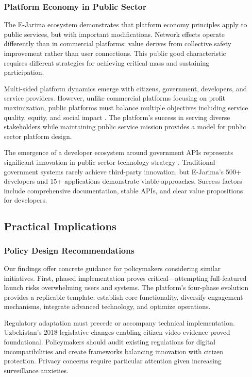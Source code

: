 \documentclass[pdflatex,sn-mathphys-num]{sn-jnl}%
\theoremstyle{thmstyleone}%
\theoremstyle{thmstyletwo}%
\theoremstyle{thmstylethree}%
\begin{document}
\subsubsection{Platform Economy in Public Sector}

The E-Jarima ecosystem demonstrates that platform economy principles apply to public services, but with important modifications. Network effects operate differently than in commercial platforms: value derives from collective safety improvement rather than user connections. This public good characteristic requires different strategies for achieving critical mass and sustaining participation.

Multi-sided platform dynamics emerge with citizens, government, developers, and service providers. However, unlike commercial platforms focusing on profit maximization, public platforms must balance multiple objectives including service quality, equity, and social impact \cite{rose2015stakeholder}. The platform's success in serving diverse stakeholders while maintaining public service mission provides a model for public sector platform design.

The emergence of a developer ecosystem around government APIs represents significant innovation in public sector technology strategy \cite{mergel2013social,bertot2010using}. Traditional government systems rarely achieve third-party innovation, but E-Jarima's 500+ developers and 15+ applications demonstrate viable approaches. Success factors include comprehensive documentation, stable APIs, and clear value propositions for developers.

\subsection{Practical Implications}\label{subsec21}

\subsubsection{Policy Design Recommendations}

Our findings offer concrete guidance for policymakers considering similar initiatives. First, phased implementation proves critical—attempting full-featured launch risks overwhelming users and systems. The platform's four-phase evolution provides a replicable template: establish core functionality, diversify engagement mechanisms, integrate advanced technology, and optimize operations.

Regulatory adaptation must precede or accompany technical implementation. Uzbekistan's 2018 legislative changes enabling citizen video evidence proved foundational. Policymakers should audit existing regulations for digital incompatibilities and create frameworks balancing innovation with citizen protection. Privacy concerns require particular attention given increasing surveillance anxieties.
\end{document}
